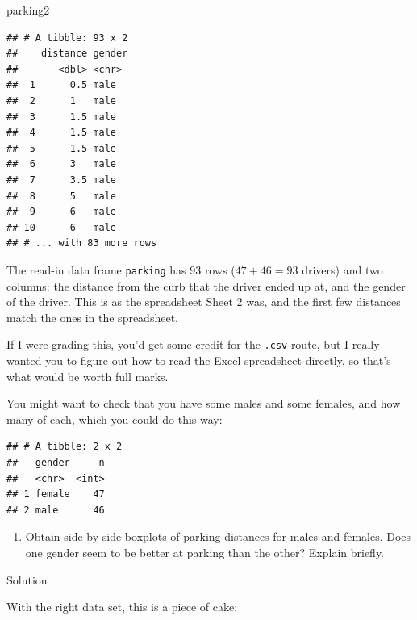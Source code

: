 \documentclass[]{tufte-book}
\newenvironment{Shaded}{}{}
\newcommand{\KeywordTok}[1]{\textcolor[rgb]{0.00,0.44,0.13}{\textbf{#1}}}
\newcommand{\NormalTok}[1]{#1}
\newcommand{\OperatorTok}[1]{\textcolor[rgb]{0.40,0.40,0.40}{#1}}
\newcommand{\StringTok}[1]{\textcolor[rgb]{0.25,0.44,0.63}{#1}}
\providecommand{\tightlist}{%
  \setlength{\itemsep}{0pt}\setlength{\parskip}{0pt}}
\theoremstyle{definition}
\theoremstyle{definition}
\theoremstyle{definition}
\theoremstyle{remark}
\begin{document}
\begin{Shaded}
\begin{Highlighting}[]
\NormalTok{parking2}
\end{Highlighting}
\end{Shaded}

\begin{verbatim}
## # A tibble: 93 x 2
##    distance gender
##       <dbl> <chr> 
##  1      0.5 male  
##  2      1   male  
##  3      1.5 male  
##  4      1.5 male  
##  5      1.5 male  
##  6      3   male  
##  7      3.5 male  
##  8      5   male  
##  9      6   male  
## 10      6   male  
## # ... with 83 more rows
\end{verbatim}

The read-in data frame \texttt{parking} has 93 rows (\(47+46=93\)
drivers) and two columns: the distance from the curb that the driver
ended up at, and the gender of the driver. This is as the spreadsheet
Sheet 2 was, and the first few distances match the ones in the
spreadsheet.

If I were grading this, you'd get some credit for the \texttt{.csv}
route, but I really wanted you to figure out how to read the Excel
spreadsheet directly, so that's what would be worth full marks.

You might want to check that you have some males and some females, and
how many of each, which you could do this way:

\begin{Shaded}
\end{Shaded}

\begin{verbatim}
## # A tibble: 2 x 2
##   gender     n
##   <chr>  <int>
## 1 female    47
## 2 male      46
\end{verbatim}

\begin{enumerate}
\def\labelenumi{(\alph{enumi})}
\setcounter{enumi}{2}
\tightlist
\item
  Obtain side-by-side boxplots of parking distances for males and
  females. Does one gender seem to be better at parking than the other?
  Explain briefly.
\end{enumerate}

Solution

With the right data set, this is a piece of cake:
\end{document}
